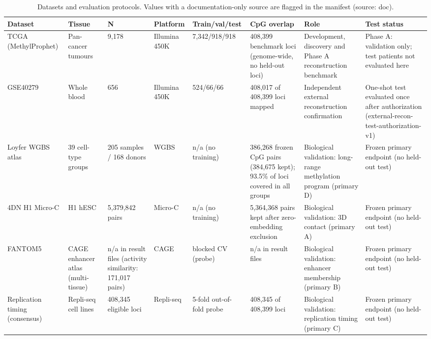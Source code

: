 \begin{table}[t]
\centering
\small
\begin{tabular}{p{2.0cm}p{1.8cm}p{1.6cm}p{1.4cm}p{1.8cm}p{2.6cm}p{2.4cm}p{2.4cm}}
\toprule
Dataset & Tissue & N & Platform & Train/val/test & CpG overlap & Role & Test status \\
\midrule
TCGA (MethylProphet) & Pan-cancer tumours & 9,178 & Illumina 450K & 7,342/918/918 & 408,399 benchmark loci (genome-wide, no held-out loci) & Development, discovery and Phase A reconstruction benchmark & Phase A: validation only; test patients not evaluated here \\
GSE40279 & Whole blood & 656 & Illumina 450K & 524/66/66 & 408,017 of 408,399 loci mapped & Independent external reconstruction confirmation & One-shot test evaluated once after authorization (external-recon-test-authorization-v1) \\
Loyfer WGBS atlas & 39 cell-type groups & 205 samples / 168 donors & WGBS & n/a (no training) & 386,268 frozen CpG pairs (384,675 kept); 93.5\% of loci covered in all groups & Biological validation: long-range methylation program (primary D) & Frozen primary endpoint (no held-out test) \\
4DN H1 Micro-C & H1 hESC & 5,379,842 pairs & Micro-C & n/a (no training) & 5,364,368 pairs kept after zero-embedding exclusion & Biological validation: 3D contact (primary A) & Frozen primary endpoint (no held-out test) \\
FANTOM5 & CAGE enhancer atlas (multi-tissue) & n/a in result files (activity similarity: 171,017 pairs) & CAGE & blocked CV (probe) & n/a in result files & Biological validation: enhancer membership (primary B) & Frozen primary endpoint (no held-out test) \\
Replication timing (consensus) & Repli-seq cell lines & 408,345 eligible loci & Repli-seq & 5-fold out-of-fold probe & 408,345 of 408,399 loci & Biological validation: replication timing (primary C) & Frozen primary endpoint (no held-out test) \\
\bottomrule
\end{tabular}
\caption{Datasets and evaluation protocols. Values with a documentation-only source are flagged in the manifest (source: doc).}
\label{tab:datasets}
\end{table}
